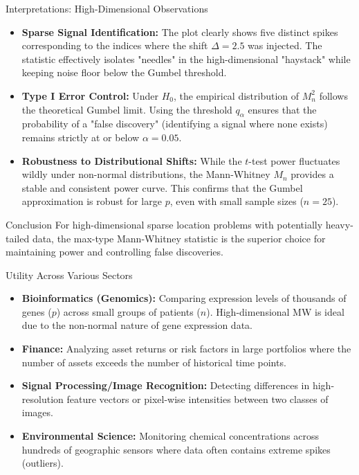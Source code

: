 \documentclass[8pt]{beamer}
\begin{document}
\begin{frame}{Interpretations: High-Dimensional Observations}
    \footnotesize
    \begin{itemize}
        \item \textbf{Sparse Signal Identification:} The plot clearly shows five distinct spikes corresponding to the indices where the shift $\Delta = 2.5$ was injected. The statistic effectively isolates "needles" in the high-dimensional "haystack" while keeping noise floor below the Gumbel threshold.
        
        \item \textbf{Type I Error Control:} Under $H_0$, the empirical distribution of $M_n^2$ follows the theoretical Gumbel limit. Using the threshold $q_\alpha$ ensures that the probability of a "false discovery" (identifying a signal where none exists) remains strictly at or below $\alpha = 0.05$.
        
        \item \textbf{Robustness to Distributional Shifts:} While the $t$-test power fluctuates wildly under non-normal distributions, the Mann-Whitney $M_n$ provides a stable and consistent power curve. This confirms that the Gumbel approximation is robust for large $p$, even with small sample sizes ($n=25$).
    \end{itemize}
    
    \begin{exampleblock}{Conclusion}
        For high-dimensional sparse location problems with potentially heavy-tailed data, the max-type Mann-Whitney statistic is the superior choice for maintaining power and controlling false discoveries.
    \end{exampleblock}
\end{frame}

\begin{frame}{Utility Across Various Sectors}
    \small
    \begin{itemize}
        \item \textbf{Bioinformatics (Genomics):} Comparing expression levels of thousands of genes ($p$) across small groups of patients ($n$). High-dimensional MW is ideal due to the non-normal nature of gene expression data.
        \item \textbf{Finance:} Analyzing asset returns or risk factors in large portfolios where the number of assets exceeds the number of historical time points.
        \item \textbf{Signal Processing/Image Recognition:} Detecting differences in high-resolution feature vectors or pixel-wise intensities between two classes of images.
        \item \textbf{Environmental Science:} Monitoring chemical concentrations across hundreds of geographic sensors where data often contains extreme spikes (outliers).
    \end{itemize}
\end{frame}
\end{document}
